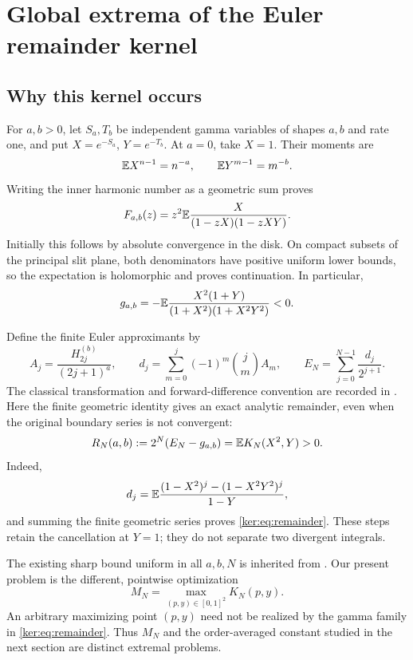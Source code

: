 \section{Global extrema of the Euler remainder kernel}
\label{sec:kernel}

\subsection{Why this kernel occurs}
For $a,b>0$, let $S_a,T_b$ be independent gamma variables of shapes
$a,b$ and rate one, and put $X=e^{-S_a}$, $Y=e^{-T_b}$.
At $a=0$, take $X=1$. Their moments are
\[
 \mathbb E X^{n-1}=n^{-a},\qquad \mathbb E Y^{m-1}=m^{-b}.
\]
Writing the inner harmonic number as a geometric sum proves
\begin{equation}\label{ker:eq:continuation}
 F_{a,b}(z)=z^2\mathbb E\frac{X}{(1-zX)(1-zXY)}.
\end{equation}
Initially this follows by absolute convergence in the disk. On compact
subsets of the principal slit plane, both denominators have positive
uniform lower bounds, so the expectation is holomorphic and proves
continuation. In particular,
\[
 g_{a,b}=-\mathbb E\frac{X^2(1+Y)}{(1+X^2)(1+X^2Y^2)}<0.
\]

Define the finite Euler approximants by
\begin{equation}\label{ker:eq:euler}
 A_j=\frac{H_{2j}^{(b)}}{(2j+1)^a},\qquad
 d_j=\sum_{m=0}^j(-1)^m\binom jm A_m,
 \qquad E_N=\sum_{j=0}^{N-1}\frac{d_j}{2^{j+1}}.
\end{equation}
The classical transformation and forward-difference convention are
recorded in \cite[Section 3.9(ii)]{DLMF}. Here the finite geometric
identity gives an exact analytic remainder, even when the original
boundary series is not convergent:
\begin{equation}\label{ker:eq:remainder}
 R_N(a,b):=2^N(E_N-g_{a,b})=\mathbb E K_N(X^2,Y)>0.
\end{equation}
Indeed,
\[
 d_j=\mathbb E\frac{(1-X^2)^j-(1-X^2Y^2)^j}{1-Y},
\]
and summing the finite geometric series proves
\eqref{ker:eq:remainder}. These steps retain the cancellation at $Y=1$;
they do not separate two divergent integrals.

The existing sharp bound uniform in all $a,b,N$ is inherited from
\cite{ProveIt,IncomingSharp,IncomingBounds}. Our present problem is the
different, pointwise optimization
\begin{equation}\label{ker:eq:MN}
 M_N=\max_{(p,y)\in[0,1]^2}K_N(p,y).
\end{equation}
An arbitrary maximizing point $(p,y)$ need not be realized by the gamma
family in \eqref{ker:eq:remainder}. Thus $M_N$ and the order-averaged
constant studied in the next section are distinct extremal problems.

